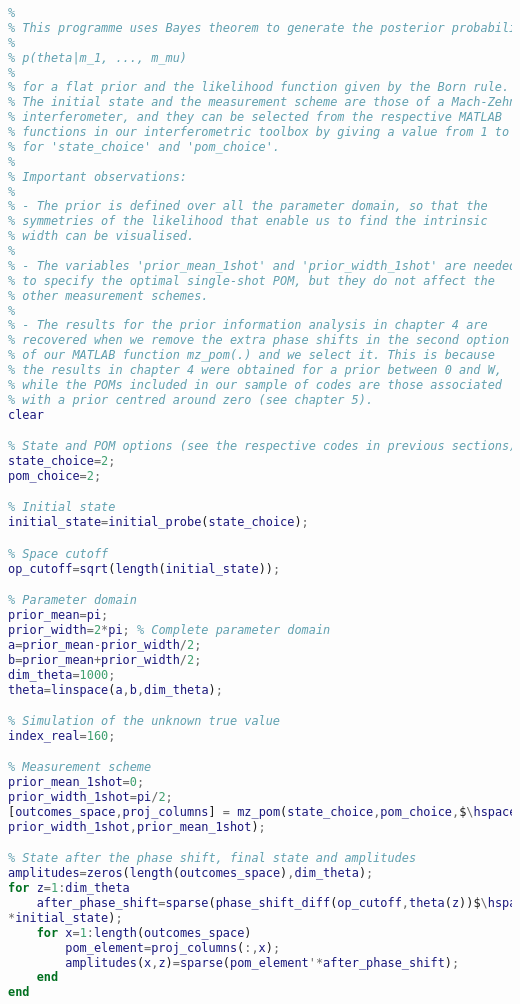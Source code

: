 \begin{lstlisting}[language=Matlab, mathescape=true]
% Prior information analysis for single-parameter schemes
%
% This programme uses Bayes theorem to generate the posterior probability
%
% p(theta|m_1, ..., m_mu)
%
% for a flat prior and the likelihood function given by the Born rule. 
% The initial state and the measurement scheme are those of a Mach-Zehnder 
% interferometer, and they can be selected from the respective MATLAB 
% functions in our interferometric toolbox by giving a value from 1 to 5
% for 'state_choice' and 'pom_choice'.
%
% Important observations:
%
% - The prior is defined over all the parameter domain, so that the 
% symmetries of the likelihood that enable us to find the intrinsic 
% width can be visualised. 
%
% - The variables 'prior_mean_1shot' and 'prior_width_1shot' are needed
% to specify the optimal single-shot POM, but they do not affect the
% other measurement schemes. 
%
% - The results for the prior information analysis in chapter 4 are 
% recovered when we remove the extra phase shifts in the second option
% of our MATLAB function mz_pom(.) and we select it. This is because
% the results in chapter 4 were obtained for a prior between 0 and W, 
% while the POMs included in our sample of codes are those associated
% with a prior centred around zero (see chapter 5). 
clear

% State and POM options (see the respective codes in previous sections)
state_choice=2;
pom_choice=2;

% Initial state
initial_state=initial_probe(state_choice);

% Space cutoff
op_cutoff=sqrt(length(initial_state));

% Parameter domain
prior_mean=pi;
prior_width=2*pi; % Complete parameter domain
a=prior_mean-prior_width/2;
b=prior_mean+prior_width/2;
dim_theta=1000;
theta=linspace(a,b,dim_theta);

% Simulation of the unknown true value
index_real=160;

% Measurement scheme
prior_mean_1shot=0;
prior_width_1shot=pi/2; 
[outcomes_space,proj_columns] = mz_pom(state_choice,pom_choice,$\hspace{0.15em}\swarrow$
prior_width_1shot,prior_mean_1shot);

% State after the phase shift, final state and amplitudes
amplitudes=zeros(length(outcomes_space),dim_theta);
for z=1:dim_theta
    after_phase_shift=sparse(phase_shift_diff(op_cutoff,theta(z))$\hspace{0.15em}\swarrow$
*initial_state);
    for x=1:length(outcomes_space)
        pom_element=proj_columns(:,x);
        amplitudes(x,z)=sparse(pom_element'*after_phase_shift);
    end
end


\end{lstlisting}
